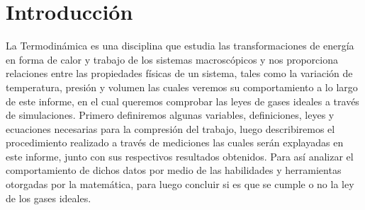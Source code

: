 \documentclass[../portafolio.tex]{subfiles}
\begin{document}
\section{Introducción}

La Termodinámica es una disciplina que estudia las transformaciones de energía en forma de calor y trabajo de los sistemas macroscópicos y nos proporciona relaciones entre las propiedades físicas de un sistema, tales como la variación de temperatura, presión y volumen las cuales veremos su comportamiento a lo largo de este informe, en el cual queremos comprobar las leyes de gases ideales a través de simulaciones. Primero definiremos algunas variables, definiciones, leyes y ecuaciones necesarias para la compresión del trabajo, luego describiremos el procedimiento realizado a través de mediciones las cuales serán explayadas en este informe, junto con sus respectivos resultados obtenidos. Para así analizar el comportamiento de dichos datos por medio de las habilidades y herramientas otorgadas por la matemática, para luego concluir si es que se cumple o no la ley de los gases ideales.
\end{document}
